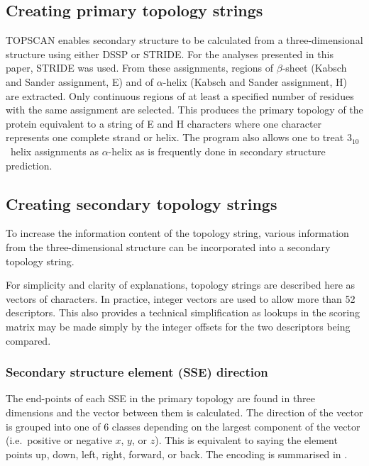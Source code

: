 \documentclass{article}
\newcommand{\htt}{\mbox{$3_{10}$}}
\begin{document}
\subsection{Creating primary topology strings}
TOPSCAN enables secondary structure to be calculated from a
three-dimensional structure using either DSSP\cite{kabsch:dictionary}
or STRIDE\cite{frishman:ssassign}. For the analyses presented in this
paper, STRIDE was used.  From these assignments, regions of
$\beta$-sheet (Kabsch and Sander assignment, E) and of $\alpha$-helix
(Kabsch and Sander assignment, H) are extracted. Only continuous
regions of at least a specified number of residues with the same
assignment are selected.  This produces the primary topology of the
protein equivalent to a string of E and H characters where one
character represents one complete strand or helix. The program also
allows one to treat \htt\ helix assignments as $\alpha$-helix as is
frequently done in secondary structure prediction.

\subsection{Creating secondary topology strings}
To increase the information content of the topology string, various
information from the three-dimensional structure can be incorporated
into a secondary topology string. 

For simplicity and clarity of explanations, topology strings are
described here as vectors of characters. In practice, integer vectors
are used to allow more than 52 descriptors. This also provides a
technical simplification as lookups in the scoring matrix may be made
simply by the integer offsets for the two descriptors being compared.

\subsubsection{Secondary structure element (SSE) direction}
The end-points of each SSE in the primary topology are found in three
dimensions and the vector between them is calculated. The direction of
the vector is grouped into one of 6 classes depending on the largest
component of the vector (i.e.\ positive or negative $x$, $y$, or
$z$). This is equivalent to saying the element points up, down, left,
right, forward, or back. The encoding is summarised in
\tableref{\ref{tab:encoding}}.
\end{document}
